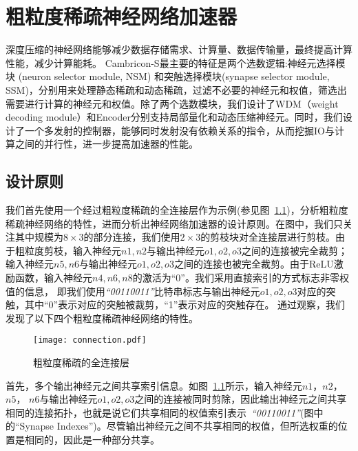 \chapter{粗粒度稀疏神经网络加速器}

深度压缩的神经网络能够减少数据存储需求、计算量、数据传输量，最终提高计算性能，减少计算能耗。 Cambricon-S最主要的特征是两个选数逻辑:神经元选择模块 (neuron selector module, NSM) 和突触选择模块(synapse selector module, SSM)，分别用来处理静态稀疏和动态稀疏，过滤不必要的神经元和权值，筛选出需要进行计算的神经元和权值。除了两个选数模块，我们设计了WDM（weight decoding module）和Encoder分别支持局部量化和动态压缩神经元。同时，我们设计了一个多发射的控制器，能够同时发射没有依赖关系的指令，从而挖掘IO与计算之间的并行性，进一步提高加速器的性能。



\section{设计原则}
\label{sec:principle}


我们首先使用一个经过粗粒度稀疏的全连接层作为示例(参见图~\ref{fig:connection})，分析粗粒度稀疏神经网络的特性，进而分析出神经网络加速器的设计原则。在图中，我们只关注其中规模为$8\times 3$的部分连接，我们使用$2\times 3$的剪枝块对全连接层进行剪枝。由于粗粒度剪枝，输入神经元$n1, n2$与输出神经元$o1, o2, o3$之间的连接被完全裁剪；输入神经元$n5, n6$与输出神经元$o1, o2, o3$之间的连接也被完全裁剪。由于ReLU激励函数，输入神经元$n4, n6, n8$的激活为“0”。我们采用直接索引的方式标志非零权值的信息，
即我们使用\emph{“00110011”}比特串标志与输出神经元$o1, o2, o3$对应的突触，其中“0”表示对应的突触被裁剪，“1”表示对应的突触存在。
通过观察，我们发现了以下四个粗粒度稀疏神经网络的特性。

\begin{figure}[ht]
\centering
\texttt{[image: connection.pdf]}
\caption{粗粒度稀疏的全连接层}
\label{fig:connection}
\end{figure}

首先，多个输出神经元之间共享索引信息。如图~\ref{fig:connection}所示，输入神经元$n1$，$n2$，$n5$， $n6$与输出神经元$o1, o2, o3$之间的连接被同时剪除，因此输出神经元之间共享相同的连接拓扑，也就是说它们共享相同的权值索引表示~\emph{“00110011”}(图中的“Synapse Indexes”)。尽管输出神经元之间不共享相同的权值，但所选权重的位置是相同的，因此是一种部分共享。

